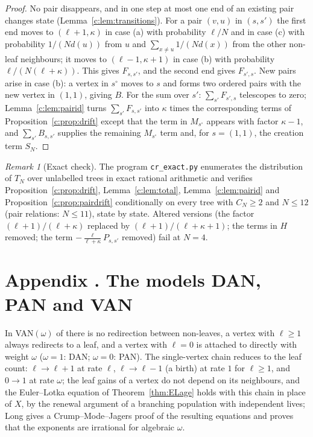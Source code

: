 \documentclass[11pt]{article}
\theoremstyle{plain}
\theoremstyle{definition}
\theoremstyle{remark}
\newtheorem{remark}[theorem]{Remark}
\begin{document}
\begin{proof}
No pair disappears, and in one step at most one end of an existing pair changes state (Lemma~\ref{c:lem:transitions}). For a pair $(v,u)$ in $(s,s')$ the first end moves to $(\ell+1,\kappa)$ in case (a) with probability $\ell/N$ and in case (c) with probability $1/(Nd(u))$ from $u$ and $\sum_{x\neq u}1/(Nd(x))$ from the other non-leaf neighbours; it moves to $(\ell-1,\kappa+1)$ in case (b) with probability $\ell/(N(\ell+\kappa))$. This gives $F_{s,s'}$, and the second end gives $F_{s',s}$. New pairs arise in case (b): a vertex in $s^{\circ}$ moves to $s$ and forms two ordered pairs with the new vertex in $(1,1)$, giving $B$. For the sum over $s'$: $\sum_{s'}F_{s',s}$ telescopes to zero; Lemma~\ref{c:lem:pairid} turns $\sum_{s'}F_{s,s'}$ into $\kappa$ times the corresponding terms of Proposition~\ref{c:prop:drift} except that the term in $M_{s^\circ}$ appears with factor $\kappa-1$, and $\sum_{s'}B_{s,s'}$ supplies the remaining $M_{s^\circ}$ term and, for $s=(1,1)$, the creation term $S_N$.
\end{proof}

\begin{remark}[Exact check]
The program \texttt{cr\_exact.py} enumerates the distribution of $T_N$ over unlabelled trees in exact rational arithmetic and verifies Proposition~\ref{c:prop:drift}, Lemma~\ref{c:lem:total}, Lemma~\ref{c:lem:pairid} and Proposition~\ref{c:prop:pairdrift} conditionally on every tree with $C_N\ge2$ and $N\le12$ (pair relations: $N\le11$), state by state. Altered versions (the factor $(\ell+1)/(\ell+\kappa)$ replaced by $(\ell+1)/(\ell+\kappa+1)$; the terms in $H$ removed; the term $-\frac{\ell}{\ell+\kappa}P_{s,s'}$ removed) fail at $N=4$.
\end{remark}


\section*{Appendix \thesection. The models DAN, PAN and VAN}\label{app:van}

In VAN$(\omega)$ of \cite{HKRZ2026} there is no redirection between non-leaves, a vertex with $\ell\ge1$ always redirects to a leaf, and a vertex with $\ell=0$ is attached to directly with weight $\omega$ ($\omega=1$: DAN; $\omega=0$: PAN). The single-vertex chain reduces to the leaf count: $\ell\to\ell+1$ at rate $\ell$, $\ell\to\ell-1$ (a birth) at rate $1$ for $\ell\ge1$, and $0\to1$ at rate $\omega$; the leaf gains of a vertex do not depend on its neighbours, and the Euler--Lotka equation of Theorem~\ref{thm:ELage} holds with this chain in place of $X$, by the renewal argument of a branching population with independent lives; Long \cite{LongLocal} gives a Crump--Mode--Jagers proof of the resulting equations and proves that the exponents are irrational for algebraic $\omega$.
\end{document}
